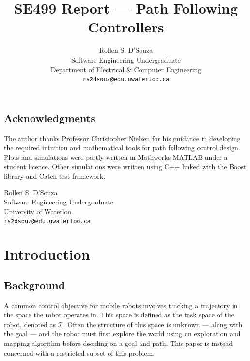 \documentclass[oneside, 11pt]{book}
\author{{Rollen S. D'Souza}\\
        {Software Engineering Undergraduate}\\
        {Department of Electrical \& Computer Engineering}\\
        {\texttt{rs2dsouz@edu.uwaterloo.ca}}}
\title{\textbf{SE499 Report --- Path Following Controllers}}
\date{}
\begin{document}
\maketitle

\frontmatter
\section*{Acknowledgments}
The author thanks Professor Christopher Nielsen for his guidance in developing the required intuition and mathematical tools for path following control design. Plots and simulations were partly written in Mathworks MATLAB under a student licence. Other simulations were written using C++ linked with the Boost library\cite{boost} and Catch test framework\cite{catch}.

\begin{flushright}
Rollen S. D'Souza\\
Software Engineering Undergraduate\\
University of Waterloo\\
\texttt{rs2dsouz@edu.uwaterloo.ca}
\end{flushright}

\tableofcontents

\printnomenclature[3cm]
\listoffigures
\listoftables


\mainmatter
\pagestyle{fancy}
\renewcommand{\sectionmark}[1]{\markright{\thesection.\ #1}}

\chapter{Introduction}

\section{Background}
A common control objective for mobile robots involves tracking a trajectory in the space the robot operates in. This space is defined as the task space of the robot, denoted as $\mathcal{T}$. Often the structure of this space is unknown --- along with the goal --- and the robot must first explore the world using an exploration and mapping algorithm before deciding on a goal and path.  This paper is instead concerned with a restricted subset of this problem.
\end{document}

